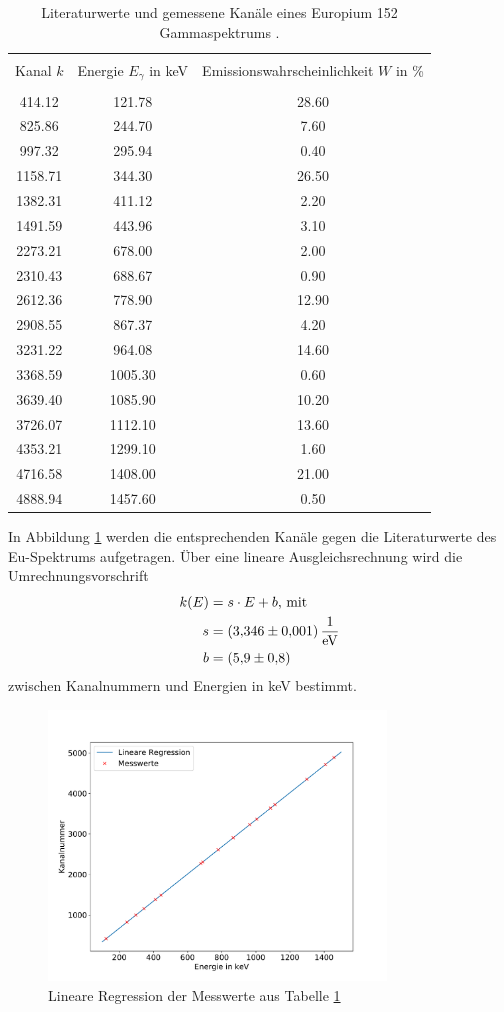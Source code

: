 \begin{table}
\centering
\caption{Literaturwerte und gemessene Kanäle eines Europium 152 Gammaspektrums \cite{sample}.}
\begin{tabular}{c c c}
\hline \\
Kanal $k$ &Energie $E_\gamma$ in keV & Emissionswahrscheinlichkeit $W$ in \% \\
\hline \\
414.12 & 121.78 & 28.60 \\ 825.86 & 244.70 & 7.60 \\ 997.32 & 295.94 & 0.40 \\ 1158.71 & 344.30 & 26.50 \\ 1382.31 & 411.12 & 2.20 \\ 1491.59 & 443.96 & 3.10 \\ 2273.21 & 678.00 & 2.00 \\ 2310.43 & 688.67 & 0.90 \\ 2612.36 & 778.90 & 12.90 \\ 2908.55 & 867.37 & 4.20 \\ 3231.22 & 964.08 & 14.60 \\ 3368.59 & 1005.30 & 0.60 \\ 3639.40 & 1085.90 & 10.20 \\ 3726.07 & 1112.10 & 13.60 \\ 4353.21 & 1299.10 & 1.60 \\ 4716.58 & 1408.00 & 21.00 \\ 4888.94 & 1457.60 & 0.50 \\
\hline
\end{tabular}
\label{tab:atab1}
\end{table}
In Abbildung \ref{fig:Kalibrierung} werden die entsprechenden Kanäle gegen die Literaturwerte des Eu-Spektrums aufgetragen.
Über eine lineare Ausgleichsrechnung wird die Umrechnungsvorschrift
\begin{align*}
k(E) &= s \cdot E + b \text{, mit}\\
  s &= \SI{3.346+-0.001}{\per\electronvolt}\\
  b &= \SI{ 5.9+-0.8}{}
\end{align*}
zwischen Kanalnummern und Energien in keV bestimmt.
\begin{figure}
\centering
\includegraphics[width=0.8\textwidth]{python/plots/kalibrierung.pdf}
\caption{Lineare Regression der Messwerte aus Tabelle \ref{tab:atab1}}
\label{fig:Kalibrierung}
\end{figure}
